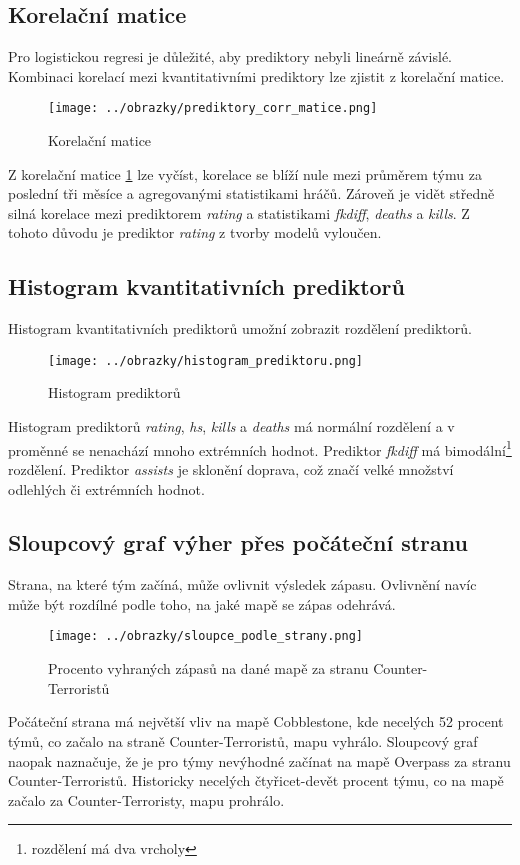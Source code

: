 \newpage
\subsection{Korelační matice}
Pro logistickou regresi je důležité, aby prediktory nebyli lineárně závislé. Kombinaci korelací mezi kvantitativními prediktory lze zjistit z korelační matice.

\begin{figure}[H]
    \centering
    \texttt{[image: ../obrazky/prediktory\_corr\_matice.png]}
    \caption{Korelační matice} 
    \label{fig:korelacni_matice}
\end{figure}

Z korelační matice \ref{fig:korelacni_matice} lze vyčíst, korelace se blíží nule mezi průměrem týmu za poslední tři měsíce a agregovanými statistikami hráčů. Zároveň je
vidět středně silná korelace mezi prediktorem \textit{rating} a statistikami \textit{fkdiff}, \textit{deaths} a \textit{kills}. Z tohoto důvodu je
prediktor \textit{rating} z tvorby modelů vyloučen.

\newpage
\subsection{Histogram kvantitativních prediktorů}
Histogram kvantitativních prediktorů umožní zobrazit rozdělení prediktorů.

\begin{figure}[H]
    \centering
    \texttt{[image: ../obrazky/histogram\_prediktoru.png]}
    \caption{Histogram prediktorů} 
    \label{fig:histogram_prediktoru}
\end{figure}

Histogram prediktorů \textit{rating}, \textit{hs}, \textit{kills} a \textit{deaths} má normální rozdělení a v proměnné se nenachází mnoho extrémních hodnot.
Prediktor \textit{fkdiff} má bimodální\footnote{rozdělení má dva vrcholy} rozdělení. Prediktor \textit{assists} je sklonění doprava, což značí velké množství 
odlehlých či extrémních hodnot.

\newpage
\subsection{Sloupcový graf výher přes počáteční stranu}
Strana, na které tým začíná, může ovlivnit výsledek zápasu. Ovlivnění navíc může být rozdílné podle toho, na jaké mapě se zápas odehrává.

\begin{figure}[H]
    \centering
    \texttt{[image: ../obrazky/sloupce\_podle\_strany.png]}
    \caption{Procento vyhraných zápasů na dané mapě za stranu Counter-Terroristů} 
    \label{fig:sloupcovy_graf_strany}
\end{figure}

Počáteční strana má největší vliv na mapě Cobblestone, kde necelých 52 procent týmů, co začalo na straně Counter-Terroristů, mapu vyhrálo. Sloupcový graf naopak naznačuje, že 
je pro týmy nevýhodné začínat na mapě Overpass za stranu Counter-Terroristů. Historicky necelých čtyřicet-devět procent týmu, co na mapě začalo za Counter-Terroristy, mapu prohrálo.

